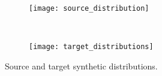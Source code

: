 \begin{figure}[ht] 
	\centering
	\begin{subfigure}[b]{0.45\textwidth}
		\centering
		\texttt{[image: source\_distribution]}	
		\label{fig:source_distribution}
	\end{subfigure}
	~ %
	\begin{subfigure}[b]{0.45\textwidth}
		\centering
		\texttt{[image: target\_distributions]}	
		\label{fig:targert_distributions}
	\end{subfigure}

  \caption{Source and target synthetic distributions.}
  \label{fig:source_target_dist}
\end{figure}


